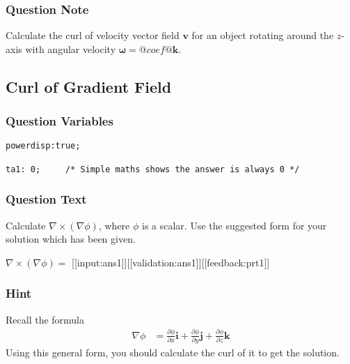 \documentclass[a4paper,10pt]{article}
\begin{document}
\subsubsection{Question Note}
Calculate the curl of velocity vector field \(\mathbf{v}\) for an object rotating around the \(z\)-axis with angular velocity \(\boldsymbol{\omega} = @coef@\mathbf{k}\).

\subsection{Curl of Gradient Field}
\subsubsection{Question Variables}
\begin{lstlisting}
powerdisp:true;

ta1: 0;     /* Simple maths shows the answer is always 0 */
\end{lstlisting}
\subsubsection{Question Text}
Calculate $\nabla \times \left( \nabla \phi \right)$, where $\phi$ is a scalar. Use the suggested form for your solution which has been given.

$\nabla \times \left( \nabla \phi \right) = $ [[input:ans1]][[validation:ans1]][[feedback:prt1]]
\subsubsection{Hint}
Recall the formula \begin{align*} \nabla\phi &= \frac{\partial \phi}{\partial x}\mathbf i + \frac{\partial \phi}{\partial y}\mathbf j + \frac{\partial \phi}{\partial z}\mathbf k \end{align*} Using this general form, you should calculate the curl of it to get the solution.
\end{document}
